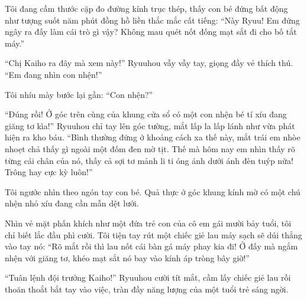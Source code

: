 \documentclass[../main.tex]{subfiles}
\begin{document}
Tôi đang cầm thước cặp đo đường kính trục thép, thấy con bé đứng bất động như tượng suốt năm phút đồng hồ liền thắc mắc cất tiếng: ``Này Ryuu! Em đứng ngây ra đấy làm cái trò gì vậy? Không mau quét nốt đống mạt sắt đi cho bố tắt máy.''

``Chị Kaiho ra đây mà xem này!'' Ryuuhou vẫy vẫy tay, giọng đầy vẻ thích thú. ``Em đang nhìn con nhện!''

Tôi nhíu mày bước lại gần: ``Con nhện?''

``Đúng rồi! Ở góc trên cùng của khung cửa sổ có một con nhện bé tí xíu đang giăng tơ kìa!'' Ryuuhou chỉ tay lên góc tường, mắt lấp la lấp lánh như vừa phát hiện ra kho báu. ``Bình thường đứng ở khoảng cách xa thế này, mắt trái em nhòe nhoẹt chả thấy gì ngoài một đốm đen mờ tịt. Thế mà hôm nay em nhìn thấy rõ từng cái chân của nó, thấy cả sợi tơ mảnh li ti óng ánh dưới ánh đèn tuýp nữa! Trông hay cực kỳ luôn!''

Tôi ngước nhìn theo ngón tay con bé. Quả thực ở góc khung kính mờ có một chú nhện nhỏ xíu đang cần mẫn dệt lưới.

Nhìn vẻ mặt phấn khích như một đứa trẻ con của cô em gái mười bảy tuổi, tôi chỉ biết lắc đầu phì cười. Tôi tiện tay rút một chiếc giẻ lau máy sạch sẽ dúi thẳng vào tay nó: ``Rõ mắt rồi thì lau nốt cái bàn gá máy phay kia đi! Ở đấy mà ngắm nhện với giăng tơ, khéo mạt sắt nó bay vào kính áp tròng bây giờ!''

``Tuân lệnh đội trưởng Kaiho!'' Ryuuhou cười tít mắt, cầm lấy chiếc giẻ lau rồi thoăn thoắt bắt tay vào việc, tràn đầy năng lượng của một tuổi trẻ sáng ngời.
\end{document}
